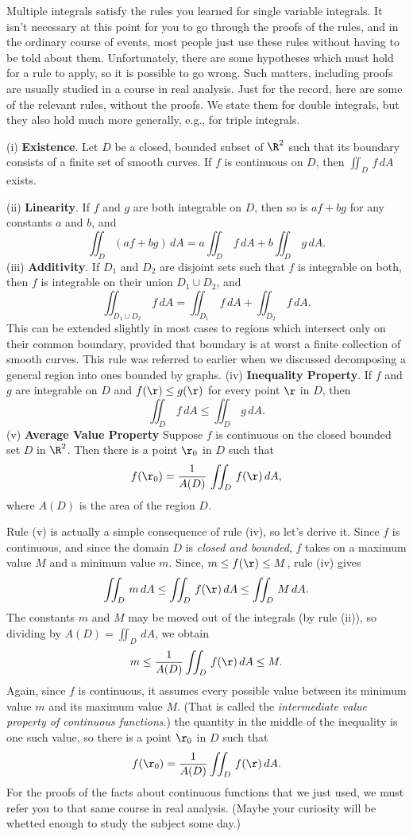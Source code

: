Multiple integrals satisfy the rules you learned for single
variable integrals.  It isn't necessary at this point for you
to go through the proofs of the rules, and in the ordinary
course of events, most people just use these rules without
having to be told about them.  Unfortunately,
there are some 
 hypotheses which must hold for a rule to apply, so it is possible to
go wrong.  Such matters, including
proofs
 are usually
studied in a course in real analysis.
Just for the record, here are some of the relevant rules,
without the proofs.
We state them for double integrals, but they also hold much more
generally, e.g., for triple integrals.
\medskip

 (i) {\bf Existence}.  Let $D$ be a closed, bounded subset of
$\R^2$ such that its boundary consists of a finite set of
smooth curves. If $f$ is continuous on 
$D$, then
$\iint_D \, f \, dA$ exists.

\smallskip
(ii)   {\bf Linearity}.  If $f$ and $g$ are both integrable on
$D$, then so is $af + bg$  for any constants $a$ and $b$, and
$$
   \iint_D (af + bg)\,dA = a\iint_D \,f\,dA + b\iint_D\,g\,dA.
$$
\smallskip
(iii)  {\bf Additivity}.   If $D_1$ and $D_2$ are disjoint sets
such that $f$ is integrable on both, then $f$ is integrable on
their union $D_1\cup D_2$, and
$$
   \iint_{D_1\cup D_2}\, f \, dA = \iint_{D_1}\,f\,dA +
\iint_{D_2}\,f\,dA.
$$
This can be extended slightly in most cases to regions which intersect
only on their common boundary, provided that boundary is at worst
a finite collection of smooth curves.  This rule was referred to
earlier when we discussed decomposing a general region into ones
bounded by graphs.
\smallskip
(iv)  {\bf Inequality Property}. If  $f$ and $g$ are integrable on
$D$ and $f(\r) \le g(\r)$ for every point $\r$ in $D$, then
$$
    \iint_D\,f\, dA \le \iint_D\, g\, dA.
$$ 
\smallskip
(v) {\bf Average Value Property}  Suppose $f$ is continuous
on the closed bounded set $D$ in $\R^2$.   Then there is a point
$\r_0$ in $D$ such that
$$
      f(\r_0) = \frac 1{A(D)}\,\iint_D\, f(\r)\, dA,
$$
where $A(D)$ is the area of the region $D$.
\medskip

Rule (v) is actually a simple consequence of rule (iv), so let's
derive it.   Since $f$ is continuous, and since the domain $D$
is {\it closed and bounded\/}, $f$ takes on a maximum value
$M$  and a minimum value $m$.   Since, $m \le f(\r) \le M$,
rule (iv) gives
$$
\iint_D \, m \, dA \le \iint_D\, f(\r)\, dA \le \iint_D\, M\,dA.
$$
The constants $m$ and $M$ may be moved out of the integrals
(by rule (ii)), so dividing by $A(D) = \iint_D\,dA$, we obtain
$$
 m  \le \frac 1{A(D)} \iint_D\, f(\r)\, dA \le  M.
$$
Again, since $f$ is continuous, it assumes every possible value
between its minimum value $m$ and its maximum value $M$.  (That
is called the {\it intermediate value property of continuous
functions}.)   the quantity in the middle of the inequality
is one such value, so there is a point $\r_0$ in $D$ such that
$$
     f(\r_0) = \frac 1{A(D)} \iint_D\, f(\r)\, dA.
$$
For the proofs of the facts about continuous functions that we
just used, we 
 must  refer you to that same
course in real analysis.   (Maybe your curiosity will be whetted
enough to study the subject some day.)

